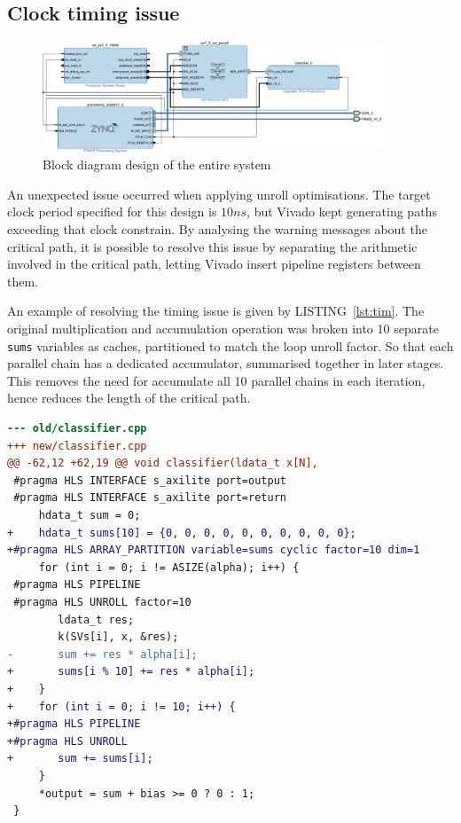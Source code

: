 \documentclass[journal]{IEEEtran}
\newcommand{\lref}[1]{LISTING~\ref{#1}}
\begin{document}
\subsection{Clock timing issue}

\begin{figure}[!t]
	\centering
	\includegraphics[width=0.9\textwidth]{bd}
	\caption{Block diagram design of the entire system}
	\label{fig:bd}
\end{figure}

An unexpected issue occurred when applying unroll optimisations. The target clock period specified for this design is $10 ns$, but Vivado kept generating paths exceeding that clock constrain. By analysing the warning messages about the critical path, it is possible to resolve this issue by separating the arithmetic involved in the critical path, letting Vivado insert pipeline registers between them.

An example of resolving the timing issue is given by \lref{lst:tim}. The original multiplication and accumulation operation was broken into 10 separate \texttt{sums} variables as caches, partitioned to match the loop unroll factor. So that each parallel chain has a dedicated accumulator, summarised together in later stages. This removes the need for accumulate all 10 parallel chains in each iteration, hence reduces the length of the critical path.

\begin{lstlisting}[float,floatplacement=h,language=diff,caption={Code modification to resolve timing issue},captionpos=b,label=lst:tim]
--- old/classifier.cpp
+++ new/classifier.cpp
@@ -62,12 +62,19 @@ void classifier(ldata_t x[N],
 #pragma HLS INTERFACE s_axilite port=output
 #pragma HLS INTERFACE s_axilite port=return
     hdata_t sum = 0;
+    hdata_t sums[10] = {0, 0, 0, 0, 0, 0, 0, 0, 0, 0};
+#pragma HLS ARRAY_PARTITION variable=sums cyclic factor=10 dim=1
     for (int i = 0; i != ASIZE(alpha); i++) {
 #pragma HLS PIPELINE
 #pragma HLS UNROLL factor=10
        ldata_t res;
        k(SVs[i], x, &res);
-       sum += res * alpha[i];
+       sums[i % 10] += res * alpha[i];
+    }
+    for (int i = 0; i != 10; i++) {
+#pragma HLS PIPELINE
+#pragma HLS UNROLL
+       sum += sums[i];
     }
     *output = sum + bias >= 0 ? 0 : 1;
 }
\end{lstlisting}
\end{document}
